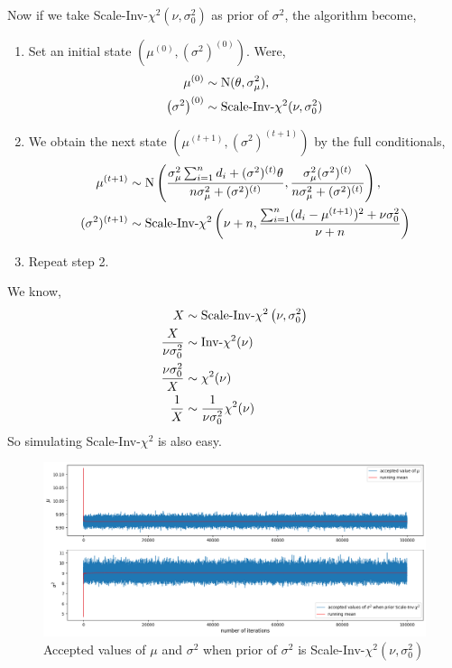 \begin{example}
    Now if we take Scale-Inv-$\chi^{2}(\nu,\sigma^{2}_0)$ as prior of $ \sigma^{2} $, the algorithm become,
    \begin{enumerate}
        \item Set an initial state $ \left( \mu^{(0)}, (\sigma^{2})^{(0)}\right)$. Were,
            \begin{align*}
                \mu^{(0)} &\sim \text{N}(\theta,\sigma_{\mu}^{2}  ), \\ 
                \left(\sigma^{2}\right)^{(0)} &\sim \text{Scale-Inv-}\chi^{2}(\nu,\sigma^{2}_0)  
            \end{align*}
        \item We obtain the next state $ \left( \mu^{(t+1)}, (\sigma^{2})^{(t+1)} \right) $ by the full conditionals,
            \begin{align*}
                \mu^{(t+1)} &\sim \text{N}\left( \frac{ \sigma_{\mu}^{2}\sum_{i=1}^{n} d_i + (\sigma^{2})^{(t)} \theta  }{ n \sigma_{\mu}^{2} + (\sigma^{2})^{(t)}  }, \frac{ \sigma_{\mu}^{2}(\sigma^{2})^{(t)}   }{ n \sigma_{\mu}^{2} + (\sigma^{2})^{(t)}  } \right), \\ 
                (\sigma^{2})^{(t+1)} &\sim \text{Scale-Inv-}\chi^{2} \left( \nu+ n , \frac{ \sum_{i=1}^{n}(d_i-\mu^{(t+1)} )^{2} + \nu \sigma_0^{2} }{ \nu + n } \right)
            \end{align*}
            \item Repeat step 2.
    \end{enumerate}
    We know,
    \begin{align*}
        X &\sim \text{Scale-Inv-}\chi^{2}\left( \nu, \sigma_0^{2} \right)\\ 
        \frac{ X }{ \nu \sigma_0^{2} } &\sim \text{Inv-}\chi^{2}(\nu) \\ 
        \frac{ \nu \sigma_0^{2} }{ X } &\sim \chi^{2}(\nu) \\ 
        \frac{ 1 }{ X } &\sim \frac{ 1 }{ \nu \sigma_0^{2} }\chi^{2}(\nu)
    \end{align*}
    So simulating Scale-Inv-$\chi^{2} $ is also easy.

    \begin{figure}[H]
        \centering
        \includegraphics[width=1\textwidth]{images/gibbs/example3/chi2-pre-burnin.png}
        \caption{Accepted values of $ \mu $ and $ \sigma^{2} $ when prior of $ \sigma^{2} $ is Scale-Inv-$\chi^{2}(\nu,\sigma^{2}_0)$}
        \label{fig:scale-inv-chi2 pre burn-in}
    \end{figure}


\end{example}
